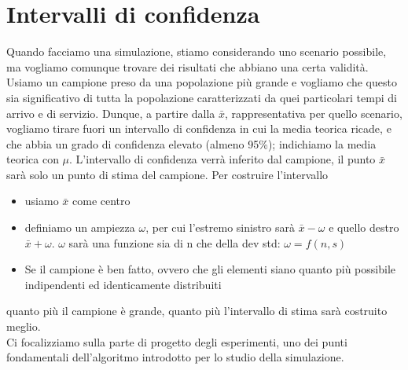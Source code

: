 \documentclass{article}
\begin{document}
\section{Intervalli di confidenza}
Quando facciamo una simulazione, stiamo considerando uno scenario possibile, ma vogliamo comunque trovare dei risultati che abbiano una certa validità. Usiamo un campione preso da una popolazione più grande e vogliamo che questo sia significativo di tutta la popolazione caratterizzati da quei particolari tempi di arrivo e di servizio. Dunque, a partire dalla $\bar{x}$, rappresentativa per quello scenario, vogliamo tirare fuori un intervallo di confidenza in cui la media teorica ricade, e che abbia un grado di confidenza elevato (almeno 95\%); indichiamo la media teorica con $\mu$. L'intervallo di confidenza verrà inferito dal campione, il punto $\bar{x}$ sarà solo un punto di stima del campione. Per costruire l'intervallo
\begin{itemize}
\item usiamo $\bar{x}$ come centro
\item definiamo un ampiezza $\omega$, per cui l'estremo sinistro sarà $\bar{x} -\omega$ e quello destro $\bar{x} + \omega$. $\omega$ sarà una funzione sia di n che della dev std: $\omega = f(n, s)$
\item Se il campione è ben fatto, ovvero che gli elementi siano quanto più possibile indipendenti ed identicamente distribuiti
\end{itemize}
quanto più il campione è grande, quanto più l'intervallo di stima sarà costruito meglio.\\ Ci focalizziamo sulla parte di progetto degli esperimenti, uno dei punti fondamentali dell'algoritmo introdotto per lo studio della simulazione.
\end{document}

